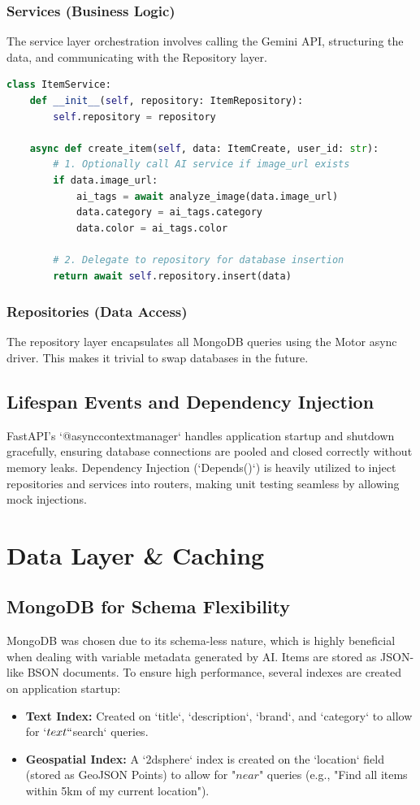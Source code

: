 \documentclass[12pt,a4paper]{report}
\begin{document}
\subsection{Services (Business Logic)}
The service layer orchestration involves calling the Gemini API, structuring the data, and communicating with the Repository layer.
\begin{lstlisting}[language=Python, caption=Service Layer Integration]
class ItemService:
    def __init__(self, repository: ItemRepository):
        self.repository = repository

    async def create_item(self, data: ItemCreate, user_id: str):
        # 1. Optionally call AI service if image_url exists
        if data.image_url:
            ai_tags = await analyze_image(data.image_url)
            data.category = ai_tags.category
            data.color = ai_tags.color
            
        # 2. Delegate to repository for database insertion
        return await self.repository.insert(data)
\end{lstlisting}

\subsection{Repositories (Data Access)}
The repository layer encapsulates all MongoDB queries using the Motor async driver. This makes it trivial to swap databases in the future.

\section{Lifespan Events and Dependency Injection}
FastAPI's `@asynccontextmanager` handles application startup and shutdown gracefully, ensuring database connections are pooled and closed correctly without memory leaks. Dependency Injection (`Depends()`) is heavily utilized to inject repositories and services into routers, making unit testing seamless by allowing mock injections.

\chapter{Data Layer \& Caching}
\section{MongoDB for Schema Flexibility}
MongoDB was chosen due to its schema-less nature, which is highly beneficial when dealing with variable metadata generated by AI.
Items are stored as JSON-like BSON documents. To ensure high performance, several indexes are created on application startup:
\begin{itemize}
    \item \textbf{Text Index:} Created on `title`, `description`, `brand`, and `category` to allow for `$text` `$search` queries.
    \item \textbf{Geospatial Index:} A `2dsphere` index is created on the `location` field (stored as GeoJSON Points) to allow for "$near$" queries (e.g., "Find all items within 5km of my current location").
\end{itemize}
\end{document}
